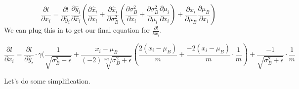 \documentclass[12pt]{article}
\begin{document}
\begin{equation*}
    \frac{\partial l}{\partial x_i} = 
    \frac{\partial l}{\partial \hat{y}_i} 
    \frac{\partial \hat{y}_i} {\partial \hat{x}_i} 
    (
        \frac{\partial \hat{x}_i}{\partial x_i} + 
        \frac{\partial \hat{x}_i}{\partial \sigma_B^2} 
        (
            \frac{\partial \sigma_B^2}{\partial x_i} + 
            \frac{\partial \sigma_B^2}{\partial \mu_i} 
            \frac{\partial \mu_i}{\partial x_i} 
        ) + 
        \frac{\partial \hat{x}_i}{\partial \mu_B}
        \frac{\partial \mu_B}{\partial x_i} 
    )
\end{equation*}
We can plug this in to get our final equation for $\frac{\partial l}{\partial x_i}$. 

\begin{equation*}
    \frac{\partial l}{\partial x_i} = \frac{\partial l}{\partial \hat{y}_i} 
    \cdot \gamma
    (
        \frac{1}{\sqrt{\sigma_B^2 + \epsilon}} +
        \frac{x_i - \mu_B}{(-2) \sqrt[3/2]{\sigma_B^2 + \epsilon}}
        (   
            \frac{2(x_i - \mu_B)}{m} +
            \frac{-2(x_i - \mu_B)}{m} 
            \cdot \frac{1}{m}
        ) + 
        \frac{-1}{\sqrt{\sigma_B^2 + \epsilon}}
        \cdot \frac{1}{m}
\end{equation*}

Let's do some simplification. 
\end{document}
